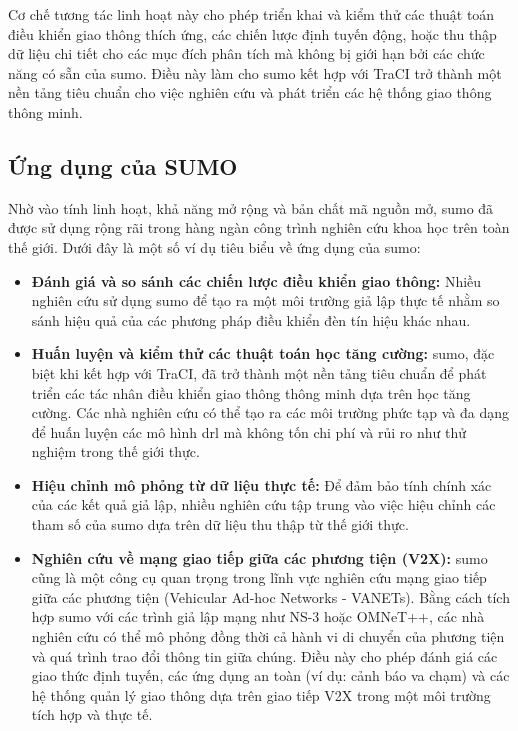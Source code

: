 Cơ chế tương tác linh hoạt này cho phép triển khai và kiểm thử các thuật toán điều
khiển giao thông thích ứng, các chiến lược định tuyến động, hoặc thu thập dữ liệu
chi tiết cho các mục đích phân tích mà không bị giới hạn bởi các chức năng có sẵn
của \ac{sumo}. Điều này làm cho \ac{sumo} kết hợp với TraCI trở thành một nền
tảng tiêu chuẩn cho việc nghiên cứu và phát triển các hệ thống giao thông thông
minh.

\subsection{Ứng dụng của SUMO}
Nhờ vào tính linh hoạt, khả năng mở rộng và bản chất mã nguồn mở, \ac{sumo} đã được
sử dụng rộng rãi trong hàng ngàn công trình nghiên cứu khoa học trên toàn thế giới.
Dưới đây là một số ví dụ tiêu biểu về ứng dụng của \ac{sumo}:
\begin{itemize}
    \item \textbf{Đánh giá và so sánh các chiến lược điều khiển giao thông:}
        Nhiều nghiên cứu sử dụng \ac{sumo} để tạo ra một môi trường giả lập thực
        tế nhằm so sánh hiệu quả của các phương pháp điều khiển đèn tín hiệu khác
        nhau.

    \item \textbf{Huấn luyện và kiểm thử các thuật toán học tăng cường:} \ac{sumo},
        đặc biệt khi kết hợp với TraCI, đã trở thành một nền tảng tiêu chuẩn để phát
        triển các tác nhân điều khiển giao thông thông minh dựa trên học tăng cường.
        Các nhà nghiên cứu có thể tạo ra các môi trường phức tạp và đa dạng để
        huấn luyện các mô hình \ac{drl} mà không tốn chi phí và rủi ro như thử nghiệm
        trong thế giới thực.

    \item \textbf{Hiệu chỉnh mô phỏng từ dữ liệu thực tế:} Để đảm bảo tính chính
        xác của các kết quả giả lập, nhiều nghiên cứu tập trung vào việc hiệu chỉnh
        các tham số của \ac{sumo} dựa trên dữ liệu thu thập từ thế giới thực.

    \item \textbf{Nghiên cứu về mạng giao tiếp giữa các phương tiện (V2X):} \ac{sumo}
        cũng là một công cụ quan trọng trong lĩnh vực nghiên cứu mạng giao tiếp giữa
        các phương tiện (Vehicular Ad-hoc Networks - VANETs). Bằng cách tích hợp
        \ac{sumo} với các trình giả lập mạng như NS-3 hoặc OMNeT++, các nhà
        nghiên cứu có thể mô phỏng đồng thời cả hành vi di chuyển của phương
        tiện và quá trình trao đổi thông tin giữa chúng. Điều này cho phép đánh giá
        các giao thức định tuyến, các ứng dụng an toàn (ví dụ: cảnh báo va chạm)
        và các hệ thống quản lý giao thông dựa trên giao tiếp V2X trong một môi trường
        tích hợp và thực tế.
\end{itemize}